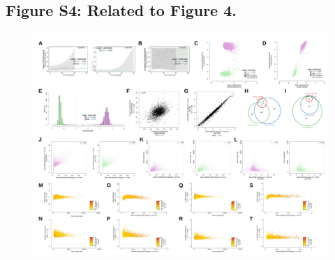 \documentclass[11pt]{biorxiv}
\begin{document}
\subsection{Figure S4: Related to Figure 4.}
\begin{figure}[ht!]
\center
\includegraphics[width=\textwidth, trim={0in 0in 0in 0in}, clip]{figures/FigS4_reduced2.pdf}
\end{figure}
\end{document}
